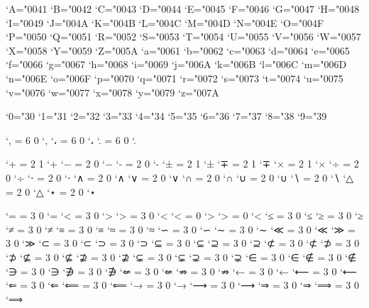 \Umathcodenum`A="0041 \Umathcodenum`B="0042 \Umathcodenum`C="0043
\Umathcodenum`D="0044 \Umathcodenum`E="0045 \Umathcodenum`F="0046
\Umathcodenum`G="0047 \Umathcodenum`H="0048 \Umathcodenum`I="0049
\Umathcodenum`J="004A \Umathcodenum`K="004B \Umathcodenum`L="004C
\Umathcodenum`M="004D \Umathcodenum`N="004E \Umathcodenum`O="004F
\Umathcodenum`P="0050 \Umathcodenum`Q="0051 \Umathcodenum`R="0052
\Umathcodenum`S="0053 \Umathcodenum`T="0054 \Umathcodenum`U="0055
\Umathcodenum`V="0056 \Umathcodenum`W="0057 \Umathcodenum`X="0058
\Umathcodenum`Y="0059 \Umathcodenum`Z="005A \Umathcodenum`a="0061
\Umathcodenum`b="0062 \Umathcodenum`c="0063 \Umathcodenum`d="0064
\Umathcodenum`e="0065 \Umathcodenum`f="0066 \Umathcodenum`g="0067
\Umathcodenum`h="0068 \Umathcodenum`i="0069 \Umathcodenum`j="006A
\Umathcodenum`k="006B \Umathcodenum`l="006C \Umathcodenum`m="006D
\Umathcodenum`n="006E \Umathcodenum`o="006F \Umathcodenum`p="0070
\Umathcodenum`q="0071 \Umathcodenum`r="0072 \Umathcodenum`s="0073
\Umathcodenum`t="0074 \Umathcodenum`u="0075 \Umathcodenum`v="0076
\Umathcodenum`w="0077 \Umathcodenum`x="0078 \Umathcodenum`y="0079
\Umathcodenum`z="007A

\Umathcodenum`0="30 \Umathcodenum`1="31 \Umathcodenum`2="32
\Umathcodenum`3="33 \Umathcodenum`4="34 \Umathcodenum`5="35
\Umathcodenum`6="36 \Umathcodenum`7="37 \Umathcodenum`8="38
\Umathcodenum`9="39

\Umathcode`, = 6 0 `,    %
\Umathcode`، = 6 0 `،    %
\Umathcode`. = 6 0 `.    %

\Umathcode`+ = 2 1 `+
\Umathcode`− = 2 0 `−    %
\Umathcode`- = 2 0 `-  
\Umathcode`± = 2 1 `±
\Umathcode`∓ = 2 1 `∓
\Umathcode`× = 2 1 `×
\Umathcode`÷ = 2 0 `÷
\Umathcode`⋅ = 2 0 `⋅
\Umathcode`∧ = 2 0 `∧
\Umathcode`∨ = 2 0 `∨
\Umathcode`∩ = 2 0 `∩
\Umathcode`∪ = 2 0 `∪
\Umathcode`∖ = 2 0 `∖
\Umathcode`△ = 2 0 `△
\Umathcode`⋆ = 2 0 `⋆

\Umathcode`= = 3 0 `=
\Umathcode`< = 3 0 `>
\Umathcode`> = 3 0 `<
\Udelcode`< = 0 `>       %
\Udelcode`> = 0 `<       %
\Umathcode`≤ = 3 0 `≤
\Umathcode`≥ = 3 0 `≥
\Umathcode`≠ = 3 0 `≠
\Umathcode`≡ = 3 0 `≡
\Umathcode`≈ = 3 0 `≈
\Umathcode`∽ = 3 0 `∽
\Umathcode`∼ = 3 0 `∼
\Umathcode`≪ = 3 0 `≪
\Umathcode`≫ = 3 0 `≫
\Umathcode`⊂ = 3 0 `⊂
\Umathcode`⊃ = 3 0 `⊃
\Umathcode`⊆ = 3 0 `⊆
\Umathcode`⊇ = 3 0 `⊇
\Umathcode`⊄ = 3 0 `⊄
\Umathcode`⊅ = 3 0 `⊅
\Umathcode`⊈ = 3 0 `⊈
\Umathcode`⊉ = 3 0 `⊉
\Umathcode`⊊ = 3 0 `⊊
\Umathcode`⊋ = 3 0 `⊋
\Umathcode`∈ = 3 0 `∈
\Umathcode`∉ = 3 0 `∉
\Umathcode`∋ = 3 0 `∋
\Umathcode`∌ = 3 0 `∌
\Umathcode`⇍ = 3 0 `⇍
\Umathcode`⇏ = 3 0 `⇏
\Umathcode`← = 3 0 `←
\Umathcode`⟵ = 3 0 `⟵
\Umathcode`⇐ = 3 0 `⇐
\Umathcode`⟸ = 3 0 `⟸
\Umathcode`→ = 3 0 `→
\Umathcode`⟶ = 3 0 `⟶
\Umathcode`⇒ = 3 0 `⇒
\Umathcode`⟹ = 3 0 `⟹



